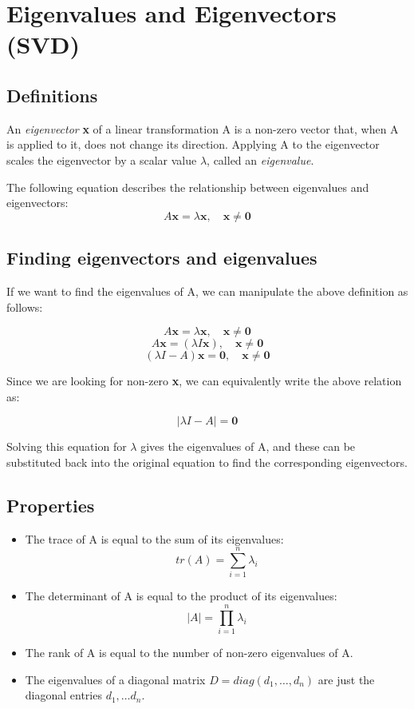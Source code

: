 \documentclass{article}
\begin{document}
\section{Eigenvalues and Eigenvectors (SVD)}

\subsection{Definitions}
An \textit{eigenvector} \textbf{x} of a linear transformation A is a non-zero vector that, when A is applied to it, does not change its direction.
Applying A to the eigenvector scales the eigenvector by a scalar value $\lambda$, called an \textit{eigenvalue}.

The following equation describes the relationship between eigenvalues and eigenvectors:
$$A\mathbf{x}=\lambda \mathbf{x}, \quad \mathbf{x}\neq \mathbf{0}$$

\subsection{Finding eigenvectors and eigenvalues}
If we want to find the eigenvalues of A, we can manipulate the above definition as follows:

$$A\mathbf{x}=\lambda \mathbf{x}, \quad \mathbf{x}\neq \mathbf{0}$$
$$A\mathbf{x}=(\lambda I \mathbf{x}), \quad \mathbf{x}\neq \mathbf{0}$$
$$(\lambda I-A)\mathbf{x}=\mathbf{0}, \quad \mathbf{x}\neq \mathbf{0}$$

Since we are looking for non-zero \textbf{x}, we can equivalently write the above relation as:

$$|\lambda I-A|=\mathbf{0}$$

Solving this equation for $\lambda$ gives the eigenvalues of A, and these can be substituted back into the original equation to find the corresponding eigenvectors.

\subsection{Properties}
\begin{itemize}
\item The trace of A is equal to the sum of its eigenvalues:
$$tr(A)=\sum_{i=1}^{n} \lambda_i$$
\item The determinant of A is equal to the product of its eigenvalues:
$$|A|=\prod_{i=1}^{n} \lambda_i$$
\item The rank of A is equal to the number of non-zero eigenvalues of A.
\item The eigenvalues of a diagonal matrix $D = diag(d_1, \ldots, d_n)$ are just the diagonal entries $d_1, \ldots d_n$.
\end{itemize}
\end{document}
